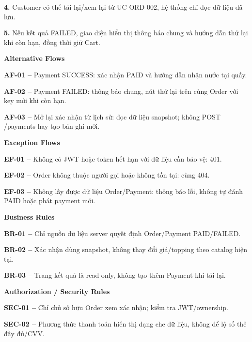 \documentclass[11pt,a4paper,oneside]{report}
\begin{document}
\textbf{4.} Customer có thể tải lại/xem lại từ UC-ORD-002, hệ thống chỉ đọc dữ liệu đã lưu.

\textbf{5.} Nếu kết quả FAILED, giao diện hiển thị thông báo chung và hướng dẫn thử lại khi còn hạn, đồng thời giữ Cart.
\par

\par\smallskip\noindent\textcolor{sgublue}{\textbf{Alternative Flows}}\par\nobreak
\textbf{AF-01 --} Payment SUCCESS: xác nhận PAID và hướng dẫn nhận nước tại quầy.

\textbf{AF-02 --} Payment FAILED: thông báo chung, nút thử lại trên cùng Order với key mới khi còn hạn.

\textbf{AF-03 --} Mở lại xác nhận từ lịch sử: đọc dữ liệu snapshot; không POST /payments hay tạo bản ghi mới.
\par

\par\smallskip\noindent\textcolor{sgublue}{\textbf{Exception Flows}}\par\nobreak
\textbf{EF-01 --} Không có JWT hoặc token hết hạn với dữ liệu cần bảo vệ: 401.

\textbf{EF-02 --} Order không thuộc người gọi hoặc không tồn tại: cùng 404.

\textbf{EF-03 --} Không lấy được dữ liệu Order/Payment: thông báo lỗi, không tự đánh PAID hoặc phát payment mới.
\par

\par\smallskip\noindent\textcolor{sgublue}{\textbf{Business Rules}}\par\nobreak
\textbf{BR-01 --} Chỉ nguồn dữ liệu server quyết định Order/Payment PAID/FAILED.

\textbf{BR-02 --} Xác nhận dùng snapshot, không thay đổi giá/topping theo catalog hiện tại.

\textbf{BR-03 --} Trang kết quả là read-only, không tạo thêm Payment khi tải lại.
\par

\par\smallskip\noindent\textcolor{sgublue}{\textbf{Authorization / Security Rules}}\par\nobreak
\textbf{SEC-01 --} Chỉ chủ sở hữu Order xem xác nhận; kiểm tra JWT/ownership.

\textbf{SEC-02 --} Phương thức thanh toán hiển thị dạng che dữ liệu, không để lộ số thẻ đầy đủ/CVV.
\par
\end{document}
